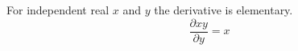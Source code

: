 \documentclass{article}
\begin{document}
For independent real $x$ and $y$ the derivative is elementary.
\begin{equation}
  \frac{\partial xy}{\partial y}=x
\end{equation}
\end{document}
